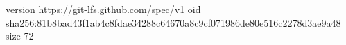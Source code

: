 version https://git-lfs.github.com/spec/v1
oid sha256:81b8bad43f1ab4c8fdae34288c64670a8c9cf071986de80e516c2278d3ae9a48
size 72
